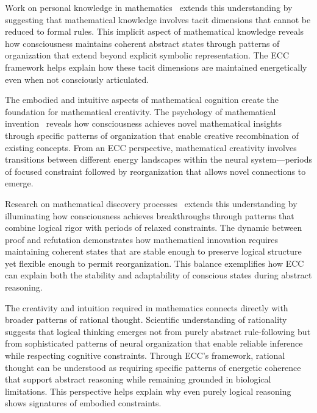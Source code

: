 Work on personal knowledge in mathematics~\cite{Polanyi1958, kukushkin2024massed} extends this understanding by suggesting that mathematical knowledge involves tacit dimensions that cannot be reduced to formal rules. This implicit aspect of mathematical knowledge reveals how consciousness maintains coherent abstract states through patterns of organization that extend beyond explicit symbolic representation. The ECC framework helps explain how these tacit dimensions are maintained energetically even when not consciously articulated.

The embodied and intuitive aspects of mathematical cognition create the foundation for mathematical creativity. The psychology of mathematical invention~\cite{Hadamard1945, bosl2025dynamical} reveals how consciousness achieves novel mathematical insights through specific patterns of organization that enable creative recombination of existing concepts. From an ECC perspective, mathematical creativity involves transitions between different energy landscapes within the neural system—periods of focused constraint followed by reorganization that allows novel connections to emerge.

Research on mathematical discovery processes~\cite{Lakatos1976, pinotsis2023cytoelectric} extends this understanding by illuminating how consciousness achieves breakthroughs through patterns that combine logical rigor with periods of relaxed constraints. The dynamic between proof and refutation demonstrates how mathematical innovation requires maintaining coherent states that are stable enough to preserve logical structure yet flexible enough to permit reorganization. This balance exemplifies how ECC can explain both the stability and adaptability of conscious states during abstract reasoning.

The creativity and intuition required in mathematics connects directly with broader patterns of rational thought. Scientific understanding of rationality~\cite{Gigerenzer2008, amil2024theta} suggests that logical thinking emerges not from purely abstract rule-following but from sophisticated patterns of neural organization that enable reliable inference while respecting cognitive constraints. Through ECC's framework, rational thought can be understood as requiring specific patterns of energetic coherence that support abstract reasoning while remaining grounded in biological limitations. This perspective helps explain why even purely logical reasoning shows signatures of embodied constraints.

